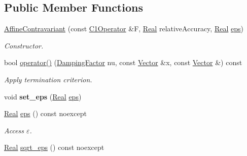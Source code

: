 \subsection*{\-Public \-Member \-Functions}
\begin{DoxyCompactItemize}
\item 
\hypertarget{classSpacy_1_1Newton_1_1Termination_1_1AffineContravariant_a84217ee3e52e0bc40ad2e1ecc13abf9a}{\hyperlink{classSpacy_1_1Newton_1_1Termination_1_1AffineContravariant_a84217ee3e52e0bc40ad2e1ecc13abf9a}{\-Affine\-Contravariant} (const \hyperlink{classSpacy_1_1C1Operator}{\-C1\-Operator} \&\-F, \hyperlink{classSpacy_1_1Real}{\-Real} relative\-Accuracy, \hyperlink{classSpacy_1_1Real}{\-Real} \hyperlink{classSpacy_1_1Mixin_1_1Eps_a812b99b0abc1d78a34b4114907f23f52}{eps})}\label{classSpacy_1_1Newton_1_1Termination_1_1AffineContravariant_a84217ee3e52e0bc40ad2e1ecc13abf9a}

\begin{DoxyCompactList}\small\item\em \-Constructor. \end{DoxyCompactList}\item 
bool \hyperlink{classSpacy_1_1Newton_1_1Termination_1_1AffineContravariant_a16b9829fd882e948b5d273b80c549f4b}{operator()} (\hyperlink{classSpacy_1_1DampingFactor}{\-Damping\-Factor} nu, const \hyperlink{classSpacy_1_1Vector}{\-Vector} \&x, const \hyperlink{classSpacy_1_1Vector}{\-Vector} \&) const 
\begin{DoxyCompactList}\small\item\em \-Apply termination criterion. \end{DoxyCompactList}\item 
\hypertarget{classSpacy_1_1Mixin_1_1Eps_a818ab6dfab5e4eea583e1302bcc621f8}{void {\bfseries set\-\_\-eps} (\hyperlink{classSpacy_1_1Real}{\-Real} \hyperlink{classSpacy_1_1Mixin_1_1Eps_a812b99b0abc1d78a34b4114907f23f52}{eps})}\label{classSpacy_1_1Mixin_1_1Eps_a818ab6dfab5e4eea583e1302bcc621f8}

\item 
\hypertarget{classSpacy_1_1Mixin_1_1Eps_a812b99b0abc1d78a34b4114907f23f52}{\hyperlink{classSpacy_1_1Real}{\-Real} \hyperlink{classSpacy_1_1Mixin_1_1Eps_a812b99b0abc1d78a34b4114907f23f52}{eps} () const noexcept}\label{classSpacy_1_1Mixin_1_1Eps_a812b99b0abc1d78a34b4114907f23f52}

\begin{DoxyCompactList}\small\item\em \-Access $\varepsilon$. \end{DoxyCompactList}\item 
\hypertarget{classSpacy_1_1Mixin_1_1Eps_a1c1b0ed7f14ed4967dc7da9295a136d4}{\hyperlink{classSpacy_1_1Real}{\-Real} \hyperlink{classSpacy_1_1Mixin_1_1Eps_a1c1b0ed7f14ed4967dc7da9295a136d4}{sqrt\-\_\-eps} () const noexcept}\label{classSpacy_1_1Mixin_1_1Eps_a1c1b0ed7f14ed4967dc7da9295a136d4}


\end{DoxyCompactItemize}
